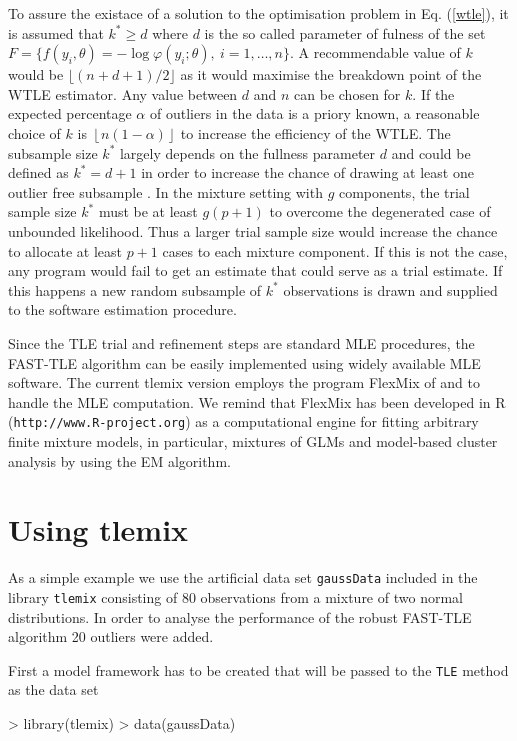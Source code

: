 \documentclass[article,shortnames,nojss]{jss}
\begin{document}
To assure the existace of a solution to the optimisation problem in Eq. (\ref{wtle}), it is assumed that $k^* \geq d$ where $d$ is the so called parameter of fulness of the set $F=\{f(y_i,\theta)=-\log\varphi(y_i;\theta), \ i=1,\ldots,n \}$.   A recommendable value of $k$ would be $\lfloor (n+d+1)/2 \rfloor$ as it would maximise the breakdown point of the WTLE estimator. Any value between $d$ and $n$ can be chosen for $k$. If the expected percentage $\alpha$ of outliers in the data is a priory known, a reasonable choice of  $k$ is $\left\lfloor n(1-\alpha) \right\rfloor$   to increase the
efficiency of the WTLE. The subsample size $k^*$ largely depends on the fullness parameter $d$ and could be defined as $k^* = d + 1$ in order to increase the chance of drawing at least one outlier free subsample \citep[see][]{NM2003}.
In the mixture setting with $g$ components, the trial sample size $k^*$ must  be at least $g(p+1)$ to overcome the degenerated case of unbounded likelihood. Thus a larger trial sample size would increase the chance to allocate at least $p+1$ cases to each mixture component. If this is not the case, any program would fail to get an estimate that could serve as a trial estimate.  If this happens a new random subsample of $k^*$ observations is drawn and supplied
to the software estimation procedure.

Since the TLE trial and refinement steps are standard MLE procedures, the
FAST-TLE algorithm can be easily implemented using widely available MLE software.
The current tlemix version employs the program FlexMix of
\cite{FL2004} and \cite{GL2008} to handle the MLE computation.
We remind that FlexMix has been developed in R ({\tt http://www.R-project.org})
as a computational engine for fitting arbitrary finite mixture models, in particular, mixtures of GLMs and model-based cluster analysis by using the EM algorithm.

\section{Using tlemix}
\label{sec:using-tlemix}



As a simple example we use the artificial data set \texttt{gaussData} included in the library \texttt{tlemix} consisting of 80 observations from a mixture of two normal distributions. In order to analyse the performance of the robust FAST-TLE algorithm 20 outliers were added.

First a model framework has to be created that will be passed to the \texttt{TLE} method as the data set
\begin{Schunk}
\begin{Sinput}
> library(tlemix)
> data(gaussData)
\end{Sinput}
\end{Schunk}
\end{document}
